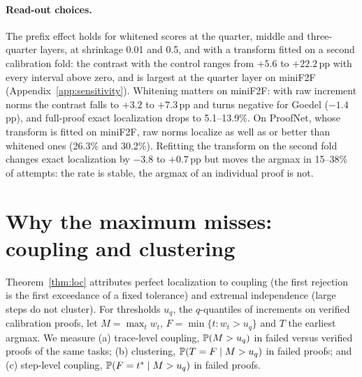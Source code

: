 \paragraph{Read-out choices.} The prefix effect holds for whitened scores at the quarter, middle and three-quarter layers, at shrinkage 0.01 and 0.5, and with a transform fitted on a second calibration fold: the contrast with the control ranges from $+5.6$ to $+22.2$\,pp with every interval above zero, and is largest at the quarter layer on miniF2F (Appendix~\ref{app:sensitivity}). Whitening matters on miniF2F: with raw increment norms the contrast falls to $+3.2$ to $+7.3$\,pp and turns negative for Goedel ($-1.4$\,pp), and full-proof exact localization drops to 5.1--13.9\%. On ProofNet, whose transform is fitted on miniF2F, raw norms localize as well as or better than whitened ones (26.3\% and 30.2\%). Refitting the transform on the second fold changes exact localization by $-3.8$ to $+0.7$\,pp but moves the argmax in 15--38\% of attempts: the rate is stable, the argmax of an individual proof is not.

\section{Why the maximum misses: coupling and clustering}\label{sec:why}

Theorem~\ref{thm:loc} attributes perfect localization to coupling (the first rejection is the first exceedance of a fixed tolerance) and extremal independence (large steps do not cluster). For thresholds $u_q$, the $q$-quantiles of increments on verified calibration proofs, let $M=\max_tw_t$, $F=\min\{t:w_t>u_q\}$ and $T$ the earliest argmax. We measure (a) trace-level coupling, $\mathbb{P}(M>u_q)$ in failed versus verified proofs of the same tasks; (b) clustering, $\mathbb{P}(T=F\mid M>u_q)$ in failed proofs; and (c) step-level coupling, $\mathbb{P}(F=t^*\mid M>u_q)$ in failed proofs.

